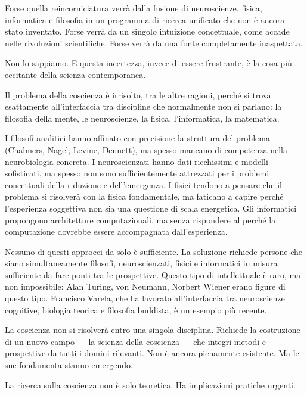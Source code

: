 \documentclass[12pt,a4paper,openany]{book}
\newcommand{\sezione}[1]{\vspace{1.2em}{\large\bfseries #1}\vspace{0.5em}\par}
\begin{document}
Forse quella reincorniciatura verrà dalla fusione di neuroscienze, fisica, informatica e filosofia in un programma di ricerca unificato che non è ancora stato inventato. Forse verrà da un singolo intuizione concettuale, come accade nelle rivoluzioni scientifiche. Forse verrà da una fonte completamente inaspettata.

Non lo sappiamo. E questa incertezza, invece di essere frustrante, è la cosa più eccitante della scienza contemporanea.

\sezione{La coscienza come problema di confine disciplinare}

Il problema della coscienza è irrisolto, tra le altre ragioni, perché si trova esattamente all'interfaccia tra discipline che normalmente non si parlano: la filosofia della mente, le neuroscienze, la fisica, l'informatica, la matematica.

I filosofi analitici hanno affinato con precisione la struttura del problema (Chalmers, Nagel, Levine, Dennett), ma spesso mancano di competenza nella neurobiologia concreta. I neuroscienzati hanno dati ricchissimi e modelli sofisticati, ma spesso non sono sufficientemente attrezzati per i problemi concettuali della riduzione e dell'emergenza. I fisici tendono a pensare che il problema si risolverà con la fisica fondamentale, ma faticano a capire perché l'esperienza soggettiva non sia una questione di scala energetica. Gli informatici propongono architetture computazionali, ma senza rispondere al perché la computazione dovrebbe essere accompagnata dall'esperienza.

Nessuno di questi approcci da solo è sufficiente. La soluzione richiede persone che siano simultaneamente filosofi, neuroscienzati, fisici e informatici in misura sufficiente da fare ponti tra le prospettive. Questo tipo di intellettuale è raro, ma non impossibile: Alan Turing, von Neumann, Norbert Wiener erano figure di questo tipo. Francisco Varela, che ha lavorato all'interfaccia tra neuroscienze cognitive, biologia teorica e filosofia buddista, è un esempio più recente.

La coscienza non si risolverà entro una singola disciplina. Richiede la costruzione di un nuovo campo --- la scienza della coscienza --- che integri metodi e prospettive da tutti i domini rilevanti. Non è ancora pienamente esistente. Ma le sue fondamenta stanno emergendo.

\sezione{Il significato pratico della ricerca sulla coscienza}

La ricerca sulla coscienza non è solo teoretica. Ha implicazioni pratiche urgenti.
\end{document}
